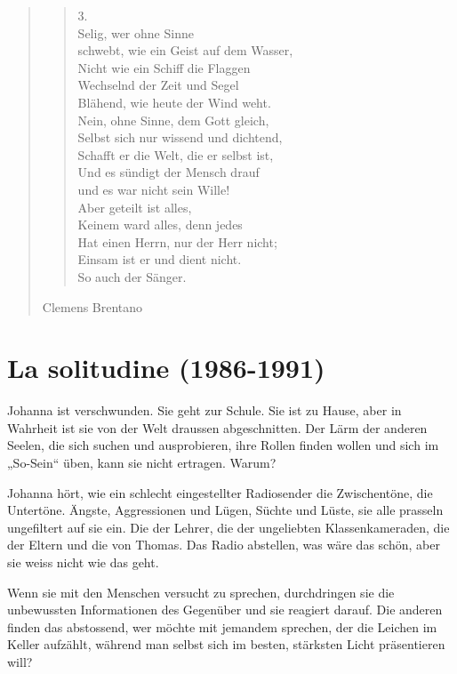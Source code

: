 \documentclass[10pt,titlepage,a5paper]{book}
\newenvironment{tg}{\begin{quote}\em}{\end{quote}}
\newenvironment{dichter}{\begin{flushright}}{\end{flushright}}
\begin{document}
\begin{tg}
\begin{verse}
3.\\
Selig, wer ohne Sinne\\
schwebt, wie ein Geist auf dem Wasser,\\
Nicht wie ein Schiff die Flaggen\\
Wechselnd der Zeit und Segel\\
Blähend, wie heute der Wind weht.\\
Nein, ohne Sinne, dem Gott gleich,\\
Selbst sich nur wissend und dichtend,\\
Schafft er die Welt, die er selbst ist,\\
Und es sündigt der Mensch drauf\\
und es war nicht sein Wille!\\
Aber geteilt ist alles,\\
Keinem ward alles, denn jedes\\
Hat einen Herrn, nur der Herr nicht;\\
Einsam ist er und dient nicht.\\
So auch der Sänger.\\
\end{verse}

\begin{dichter}Clemens Brentano\end{dichter}

\end{tg}

\section*{La solitudine (1986-1991)}




Johanna ist verschwunden. Sie geht zur Schule. Sie ist zu Hause, aber in Wahrheit ist sie von der Welt draussen abgeschnitten. Der Lärm der anderen Seelen, die sich suchen und ausprobieren, ihre Rollen finden wollen und sich im „So-Sein“ üben, kann sie nicht ertragen. Warum?

Johanna hört, wie ein schlecht eingestellter Radiosender die Zwischentöne, die Untertöne. Ängste, Aggressionen und Lügen, Süchte und Lüste, sie alle prasseln ungefiltert auf sie ein. Die der Lehrer, die der ungeliebten Klassenkameraden, die der Eltern und die von Thomas. Das Radio abstellen, was wäre das schön, aber sie weiss nicht wie das geht.

Wenn sie mit den Menschen versucht zu sprechen, durchdringen sie die unbewussten Informationen des Gegenüber und sie reagiert darauf. Die anderen finden das abstossend, wer möchte mit jemandem sprechen, der die Leichen im Keller aufzählt, während man selbst sich im besten, stärksten Licht präsentieren will?
\end{document}
